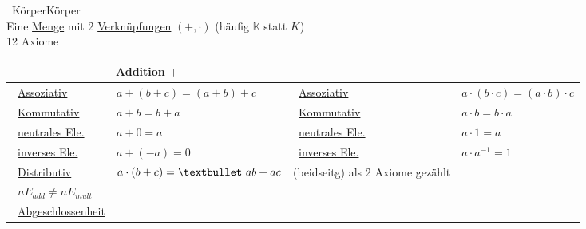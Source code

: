 		
		\begin{proposition}{\currentboxsection \ Körper}{Körper} \label{koerper}  \\
			Eine \hyperref[menge]{Menge} mit 2 \hyperref[verknuepfung]{Verknüpfungen} $(+,\cdot)$ \hspace{5cm} (häufig $\mathbb{K}$ statt $K$) \\
			12 Axiome \\
			\begin{tabular}{|m{3.35cm}|>{\centering\arraybackslash}m{3.6cm}|m{2.8cm}|>{\centering\arraybackslash}m{3.5cm}|}
				\hline
				\multicolumn{2}{|c|}{Addition $+$} & \multicolumn{2}{c|}{Multiplication $\cdot$} \\
				\hline
				\textbullet \ \hyperref[assoziativ]{Assoziativ} & $a+(b+c) = (a+b)+c$ & \textbullet \ \hyperref[assoziativ]{Assoziativ} & $a \cdot (b \cdot c) = (a \cdot b) \cdot c$ \\
				\textbullet \ \hyperref[kommutativ]{Kommutativ}  & $a+b = b+a$ & \textbullet \ \hyperref[kommutativ]{Kommutativ} & $a \cdot b = b \cdot a$ \\
				\textbullet \ \hyperref[neutral_element]{neutrales Ele.}  & $a+0 = a$ & \textbullet \ \hyperref[neutral_element]{neutrales Ele.} & $a \cdot 1 = a$ \\
				\textbullet \ \hyperref[invers_element]{inverses Ele.}  & $a+(-a) = 0$ & \textbullet \ \hyperref[invers_element]{inverses Ele.} & $a \cdot a^{-1} = 1$ \\
				\textbullet \ \hyperref[distributiv]{Distributiv} & $a \cdot (b+c) = \textbullet \ ab+ac$ & (beidseitg) als 2 Axiome gezählt & \\
				\textbullet \ $nE_{add} \neq nE_{mult}$ & & & \\
				\textbullet \ \hyperref[abgeschlossenheit_menge]{Abgeschlossenheit} & & & \\
				\hline
			\end{tabular}
		\end{proposition}
		

